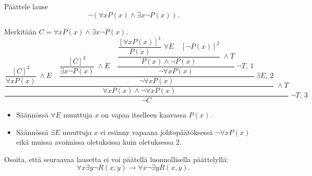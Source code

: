 \documentclass[11pt,a4paper]{amsart}
\begin{document}
\begin{samepage}
  \begin{exercise}
    Päättele lause
    \[
      \neg(\forall xP(x) \land \exists x\neg P(x)).
    \]
  \end{exercise}

  \begin{solution}
    Merkitään \(C=\forall xP(x)\land\exists x\neg P(x)\).
    \[
      \dfrac{
        \dfrac{
          \dfrac{[C]^3}{\forall xP(x)}\;\land E
          \quad
          \dfrac{
            \dfrac{[C]^3}{\exists x\neg P(x)}\;\land E
            \quad
            \dfrac{
              \dfrac{
                \dfrac{[\forall xP(x)]^1}{P(x)}\;\forall E
                \quad [\neg P(x)]^2
              }{P(x)\land\neg P(x)}\;\land T
            }{\neg\forall xP(x)}\;\neg T,\,1
          }{\neg\forall xP(x)}\;\exists E,\,2
        }{\forall xP(x)\land\neg\forall xP(x)}\;\land T
      }{\neg C}\;\neg T,\,3
    \]
    \begin{itemize}
      \item Säännössä \(\forall E\) muuttuja \(x\) on vapaa itselleen
        kaavassa \(P(x)\).
      \item Säännössä \(\exists E\) muuttuja \(x\) ei esiinny vapaana
        johtopäätöksessä \(\neg\forall xP(x)\) eikä muissa avoimissa
        oletuksissa kuin oletuksessa \(2\).\qedhere
    \end{itemize}
  \end{solution}
\end{samepage}

\begin{exercise}
  Osoita, että seuraavaa lausetta ei voi päätellä luonnollisella päättelyllä:
  \[
    \forall x\exists y\neg R(x,y) \to \forall x\neg\exists yR(x,y).
  \]
\end{exercise}
\end{document}
